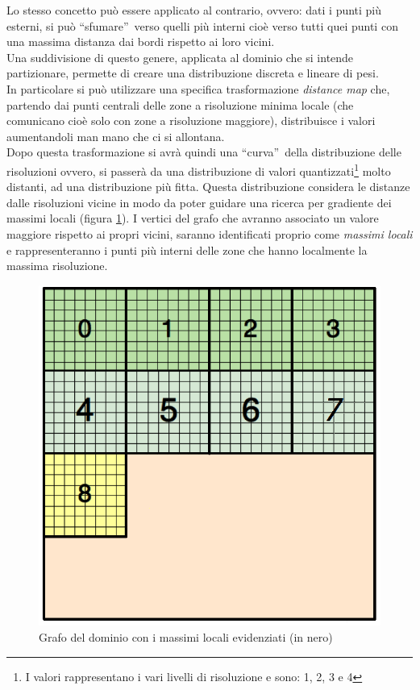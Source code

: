 {Lo stesso concetto può essere applicato al contrario, ovvero: dati i punti più esterni, si può \textquotedblleft sfumare\textquotedblright~verso quelli più interni cioè verso tutti quei punti con una massima distanza dai bordi rispetto ai loro vicini.\\
Una suddivisione di questo genere, applicata al dominio che si intende partizionare, permette di creare una distribuzione discreta e lineare di pesi.\\
In particolare si può utilizzare una specifica trasformazione \textit{distance map} che, partendo dai punti centrali delle zone a risoluzione minima locale (che comunicano cioè solo con zone a risoluzione maggiore), distribuisce i valori aumentandoli man mano che ci si allontana.\\
Dopo questa trasformazione si avrà quindi una \textquotedblleft curva\textquotedblright~della distribuzione delle risoluzioni ovvero, si passerà da una distribuzione di valori quantizzati\footnote{I valori rappresentano i vari livelli di risoluzione e sono: 1, 2, 3 e 4} molto distanti, ad una distribuzione più fitta. Questa distribuzione considera le distanze dalle risoluzioni vicine in modo da poter guidare una ricerca per gradiente dei massimi locali (figura \ref{fig:local_max_graph}).
I vertici del grafo che avranno associato un valore maggiore rispetto ai propri vicini, saranno identificati proprio come \emph{massimi locali} e rappresenteranno i punti più interni delle zone che hanno localmente la massima risoluzione.\\
\begin{figure}[H]
	\centering
	\includegraphics[width=1.0\textwidth]{immagini/block_on_grid.png}
	\caption{Grafo del dominio con i massimi locali evidenziati (in nero)}
	\label{fig:local_max_graph}
\end{figure}

}
